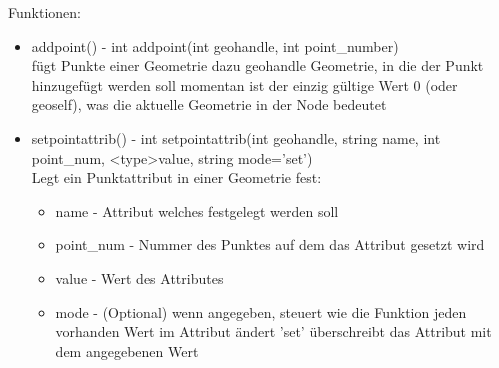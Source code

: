 \documentclass[paper=a4,fontsize=12pt,ngerman]{scrartcl}
\begin{document}
 	Funktionen:
 	\begin{itemize}
 		\item addpoint() - int addpoint(int geohandle, int point\_number)\\
 		fügt Punkte einer Geometrie dazu
 		geohandle 	Geometrie, in die der Punkt hinzugefügt werden soll
 		momentan ist der einzig gültige Wert 0 (oder geoself), was die aktuelle Geometrie in der Node bedeutet
 		\item setpointattrib() - int setpointattrib(int geohandle, string name, int point\_num, <type>value, string mode='set')\\
 		Legt ein Punktattribut in einer Geometrie fest:
 		\begin{itemize}
 			\item name - Attribut welches festgelegt werden soll
 			\item point\_num - Nummer des Punktes auf dem das Attribut gesetzt wird
 			\item value - Wert des Attributes
 			\item mode - (Optional)
 			wenn angegeben, steuert wie die Funktion jeden vorhanden Wert im Attribut ändert 
 			'set' überschreibt das Attribut mit dem angegebenen Wert	 	
 		\end{itemize}						
 		

\end{itemize}
\end{document}
